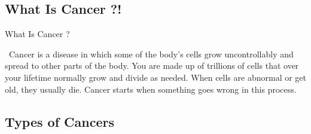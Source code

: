 \documentclass{beamer}
\begin{document}
    \subsection{What Is Cancer ?!}
    \begin{frame}[t]{What Is Cancer ?}
      
      \justifying\ Cancer is a disease in which some of the body’s cells grow uncontrollably and spread to other parts of the body. 
      You are made up of trillions of cells that over your lifetime normally grow and divide as needed. When cells are abnormal or get old, they usually die. Cancer starts when something goes wrong in this process.
      \vspace{8mm}
      
    \end{frame}
    \subsection{Types of Cancers}
\end{document}
